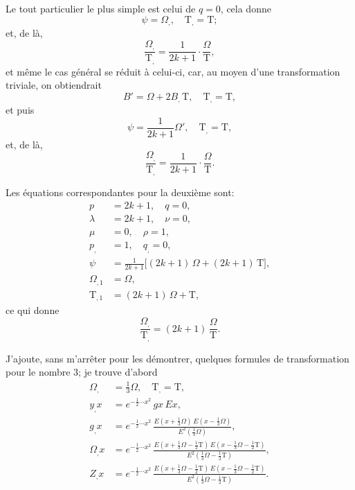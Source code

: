 \documentclass[11pt,a4paper]{article}
\begin{document}
Le tout particulier le plus simple est celui de $q = 0$, cela donne
\[ \psi = \Omega_{,},\quad \mathrm{T}_{,} = \mathrm{T}; \]
et, de l\`a,
\[
\frac{\Omega_{,}}{\mathrm{T}_{,}} = \frac{1}{2k+1}\cdot\frac{\Omega}{\mathrm{T}},
\]
et m\^eme le cas g\'en\'eral se r\'eduit \`a celui-ci, car, au moyen d'une transformation triviale, on obtiendrait
\[
B' = \Omega + 2 B_{,}\,\mathrm{T},\quad \mathrm{T}_{,} = \mathrm{T},
\]
et puis
\[
\psi = \frac{1}{2k+1}\Omega',\quad \mathrm{T}_{,} = \mathrm{T},
\]
et, de l\`a,
\[
\frac{\Omega_{,}}{\mathrm{T}_{,}} = \frac{1}{2k+1}\cdot\frac{\Omega}{\mathrm{T}}.
\]

\medskip

Les \'equations correspondantes pour la deuxi\`eme sont:
\begin{align*}
p &= 2k+1,\quad q = 0,\\
\lambda &= 2k+1,\quad \nu = 0,\\
\mu &= 0,\quad \rho = 1,\\
p_{,} &= 1,\quad q_{,} = 0,\\
\psi &= \tfrac{1}{2k+1}\bigl[(2k+1)\,\Omega + (2k+1)\,\mathrm{T}\bigr],\\
\Omega_{,1} &= \Omega,\\
\mathrm{T}_{,1} &= (2k+1)\,\Omega + \mathrm{T},
\end{align*}
ce qui donne
\[
\frac{\Omega_{,}}{\mathrm{T}_{,}} = (2k+1)\,\frac{\Omega}{\mathrm{T}}.
\]

\medskip

J'ajoute, sans m'arr\^eter pour les d\'emontrer, quelques formules de transformation pour le nombre $3$; je trouve d'abord
\begin{align*}
\Omega_{,} &= \tfrac{1}{3}\Omega,\quad \mathrm{T}_{,} = \mathrm{T},\\
y_{,} x &= e^{-\frac{1}{2}\cdots x^2}\, gx\,Ex,\\
g_{,} x &= e^{-\frac{1}{2}\cdots x^2}\,\frac{E(x + \tfrac{1}{3}\Omega)\,E(x - \tfrac{1}{3}\Omega)}{E^2(\tfrac{1}{3}\Omega)},\\
\Omega_{,} x &= e^{-\frac{1}{2}\cdots x^2}\,\frac{E(x + \tfrac{1}{3}\Omega - \tfrac{1}{2}\mathrm{T})\,E(x - \tfrac{1}{3}\Omega - \tfrac{1}{2}\mathrm{T})}{E^2(\tfrac{1}{3}\Omega - \tfrac{1}{2}\mathrm{T})},\\
Z_{,} x &= e^{-\frac{1}{2}\cdots x^2}\,\frac{E(x + \tfrac{1}{3}\Omega - \tfrac{1}{2}\mathrm{T})\,E(x - \tfrac{1}{3}\Omega - \tfrac{1}{2}\mathrm{T})}{E^2(\tfrac{1}{3}\Omega - \tfrac{1}{2}\mathrm{T})}.
\end{align*}
\end{document}

